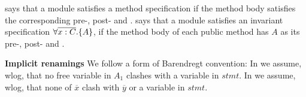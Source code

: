 %
% 
 {{} says that  a module satisfies a method specification if the method body satisfies the corresponding pre-, post- and \midcond.
 }
 {{} says that  a module satisfies an invariant specification $\forall { \overline{x:C}}.{{\{}}{A}{{\}}}$,  if the method body of each public method
 has $A$ as its  pre-, post- and \midcond.}
 
 \vspace{.1cm}

\noindent
\textbf{Implicit renamings} We follow a form of Barendregt convention: In  {}  we assume, wlog, that no free variable  in $A_1$   clashes with a variable  in $stmt$.
In {} we assume, wlog, that none of
 $\overline x$ clash with  $\overline y$ or a variable  in $stmt$. 


